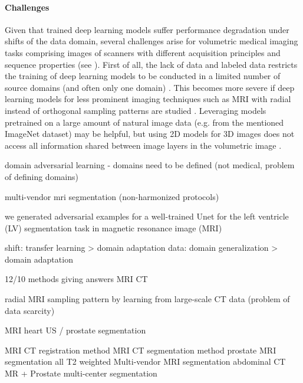         \paragraph{Challenges} Given that trained deep learning models suffer performance degradation under shifts of the data domain, several challenges arise for volumetric medical imaging tasks comprising images of scanners with different acquisition principles and sequence properties (see ).
        First of all, the lack of data and labeled data restricts the training of deep learning models to be conducted in a limited number of source domains (and often only one domain) \citep{guan2021domain}.
        This becomes more severe if deep learning models for less prominent imaging techniques such as \ac{MRI} with radial instead of orthogonal sampling patterns are studied \citep{han2018deep}.
        Leveraging models pretrained on a large amount of natural image data (e.g. from the mentioned ImageNet dataset) may be helpful, but using \ac{2D} models for \ac{3D} images does not access all information shared between image layers in the volumetric image \citep{guan2021domain}.


        \citep{ganin2016domain} domain adversarial learning - domains need to be defined (not medical, problem of defining domains)

        \citep{yan2019edge} multi-vendor mri segmentation (non-harmonized protocols)

        \citep{yan2019domain} we generated adversarial
        examples for a well-trained Unet for the left ventricle (LV) segmentation task in
        magnetic resonance image (MRI)

        \citep{yan2019domain} shift: transfer learning > domain adaptation
        data: domain generalization > domain adaptation




        12/10 methods giving answers MRI CT

        \citep{han2018deep} radial MRI sampling pattern by learning from large-scale CT data (problem of data scarcity)

        \citep{zhang2020generalizing} MRI heart US / prostate segmentation

        \citep{siebert2021fast} MRI CT registration method
        \citep{ouyang2022causality} MRI CT segmentation method
        \citep{liu2020shape} prostate MRI segmentation all T2 weighted
        \citep{huang2022online} Multi-vendor MRI segmentation
        \citep{gao2024desam} abdominal CT MR + Prostate multi-center segmentation

